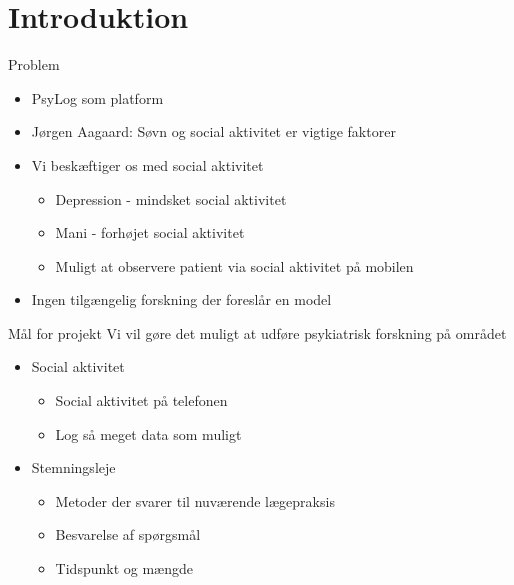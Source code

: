 \section{Introduktion}
{%
	\begin{frame}{Problem} %
\begin{itemize}
	\item PsyLog som platform
	\item Jørgen Aagaard: Søvn og social aktivitet er vigtige faktorer
	\item Vi beskæftiger os med social aktivitet
	\begin{itemize}
		\item Depression - mindsket social aktivitet
		\item Mani - forhøjet social aktivitet
		\item Muligt at observere patient via social aktivitet på mobilen
	\end{itemize}
	\item Ingen tilgængelig forskning der foreslår en model
\end{itemize}

\end{frame}}


{ %
	\begin{frame}{Mål for projekt} %
		Vi vil gøre det muligt at udføre psykiatrisk forskning på området
		\begin{itemize}
			\item Social aktivitet
			\begin{itemize}
				\item Social aktivitet på telefonen
				\item Log så meget data som muligt
			\end{itemize}	
			\item Stemningsleje
			\begin{itemize}
				\item Metoder der svarer til nuværende lægepraksis
				\item Besvarelse af spørgsmål
				\item Tidspunkt og mængde
			\end{itemize}
		\end{itemize}
	\end{frame}}
	



